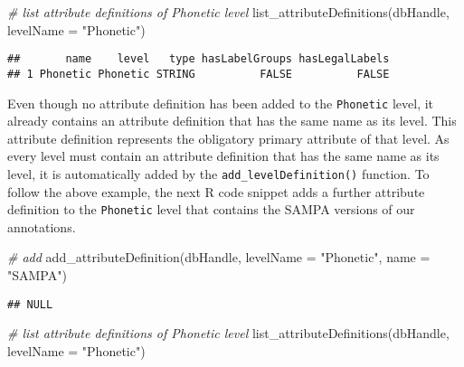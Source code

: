 \documentclass[
]{book}
\newenvironment{Shaded}{\begin{snugshade}}{\end{snugshade}}
\newcommand{\AttributeTok}[1]{\textcolor[rgb]{0.77,0.63,0.00}{#1}}
\newcommand{\CommentTok}[1]{\textcolor[rgb]{0.56,0.35,0.01}{\textit{#1}}}
\newcommand{\FunctionTok}[1]{\textcolor[rgb]{0.00,0.00,0.00}{#1}}
\newcommand{\NormalTok}[1]{#1}
\newcommand{\StringTok}[1]{\textcolor[rgb]{0.31,0.60,0.02}{#1}}
\begin{document}
\begin{Shaded}
\begin{Highlighting}[]
\CommentTok{\# list attribute definitions of \textquotesingle{}Phonetic\textquotesingle{} level}
\FunctionTok{list\_attributeDefinitions}\NormalTok{(dbHandle,}
                          \AttributeTok{levelName =} \StringTok{"Phonetic"}\NormalTok{)}
\end{Highlighting}
\end{Shaded}

\begin{verbatim}
##       name    level   type hasLabelGroups hasLegalLabels
## 1 Phonetic Phonetic STRING          FALSE          FALSE
\end{verbatim}

Even though no attribute definition has been added to the \texttt{Phonetic} level, it already contains an attribute definition that has the same name as its level. This attribute definition represents the obligatory primary attribute of that level. As every level must contain an attribute definition that has the same name as its level, it is automatically added by the \texttt{add\_levelDefinition()} function. To follow the above example, the next R code snippet adds a further attribute definition to the \texttt{Phonetic} level that contains the SAMPA versions of our annotations.

\begin{Shaded}
\begin{Highlighting}[]
\CommentTok{\# add}
\FunctionTok{add\_attributeDefinition}\NormalTok{(dbHandle,}
                        \AttributeTok{levelName =} \StringTok{"Phonetic"}\NormalTok{,}
                        \AttributeTok{name =} \StringTok{"SAMPA"}\NormalTok{)}
\end{Highlighting}
\end{Shaded}

\begin{verbatim}
## NULL
\end{verbatim}

\begin{Shaded}
\begin{Highlighting}[]
\CommentTok{\# list attribute definitions of \textquotesingle{}Phonetic\textquotesingle{} level}
\FunctionTok{list\_attributeDefinitions}\NormalTok{(dbHandle,}
                          \AttributeTok{levelName =} \StringTok{"Phonetic"}\NormalTok{)}
\end{Highlighting}
\end{Shaded}
\end{document}
